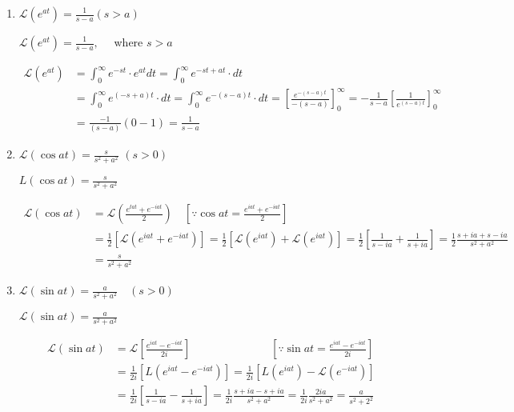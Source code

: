 \begin{enumerate}
	\item $\mathcal{L}\left(e^{a t}\right)=\frac{1}{s-a}(s>a)$
	\begin{exercise}
		$\mathcal{L}\left(e^{a t}\right)=\frac{1}{s-a}, \quad$ where $s>a$
	\end{exercise}
	\begin{answer}
		\begin{align*}
		\mathcal{L}\left(e^{a t}\right) &=\int_{0}^{\infty} e^{-s t} \cdot e^{a t} d t=\int_{0}^{\infty} e^{-s t+a t} \cdot d t \\
		&=\int_{0}^{\infty} e^{(-s+a) t} \cdot d t=\int_{0}^{\infty} e^{-(s-a) t} \cdot d t=\left[\frac{e^{-(s-a) t}}{-(s-a)}\right]_{0}^{\infty}=-\frac{1}{s-a}\left[\frac{1}{e^{(s-a) t}}\right]_{0}^{\infty}\\
		&=\frac{-1}{(s-a)}(0-1)=\frac{1}{s-a}
		\end{align*}
	\end{answer}
	\item $\mathcal{L}(\cos a t)=\frac{s}{s^{2}+a^{2}}$
	$(s>0)$
	\begin{exercise}
		$L(\cos a t)=\frac{s}{s^{2}+a^{2}}$
	\end{exercise}
	\begin{answer}
		\begin{align*}
		\mathcal{L}(\cos a t)&=\mathcal{L}\left(\frac{e^{t a t}+e^{-i a t}}{2}\right) \quad\left[\because \cos a t=\frac{e^{i a t}+e^{-i a t}}{2}\right]\\
		&=\frac{1}{2}\left[\mathcal{L}\left(e^{i a t}+e^{-i a t}\right)\right]=\frac{1}{2}\left[\mathcal{L}\left(e^{i a t}\right)+\mathcal{L}\left(e^{i a t}\right)\right]=\frac{1}{2}\left[\frac{1}{s-i a}+\frac{1}{s+i a}\right]=\frac{1}{2} \frac{s+i a+s-i a}{s^{2}+a^{2}}\\
		&=\frac{s}{s^{2}+a^{2}}
		\end{align*}
	\end{answer}
	\item $\mathcal{L}(\sin a t)=\frac{a}{s^{2}+a^{2}} \quad(s>0)$
		\begin{exercise}
		$\mathcal{L}(\sin a t)=\frac{a}{s^{2}+a^{2}}$
	\end{exercise}
	\begin{answer}
		\begin{align*}
		\mathcal{L}(\sin a t)&=\mathcal{L}\left[\frac{e^{i a t}-e^{-i a t}}{2 i}\right]\hspace{3cm} \left[\because \sin a t=\frac{e^{i a t}-e^{-i a t}}{2 i}\right]\\
		&=\frac{1}{2 i}\left[L\left(e^{i a t}-e^{-i a t}\right)\right]=\frac{1}{2 i}\left[L\left(e^{i a t}\right)-\mathcal{L}\left(e^{-i a t}\right)\right] \\
		&=\frac{1}{2 i}\left[\frac{1}{s-i a}-\frac{1}{s+i a}\right]=\frac{1}{2 i} \frac{s+i a-s+i a}{s^{2}+a^{2}}=\frac{1}{2 i} \frac{2 i a}{s^{2}+a^{2}}=\frac{a}{s^{2}+2^{2}}
		\end{align*}
	\end{answer}
	

\end{enumerate}
